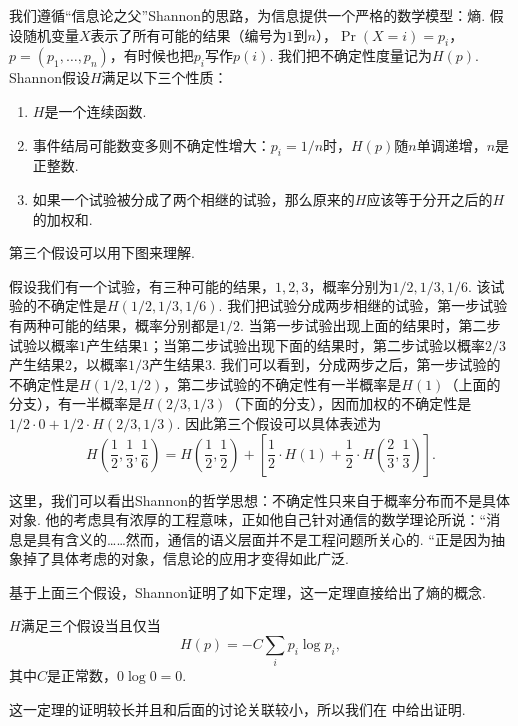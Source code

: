 我们遵循“信息论之父”Shannon的思路，为信息提供一个严格的数学模型：熵. 假设随机变量$X$表示了所有可能的结果（编号为$1$到$n$），$\Pr(X=i)=p_i$，$p=(p_1,\dots,p_n)$，有时候也把$p_i$写作$p(i)$. 我们把不确定性度量记为$H(p)$. Shannon假设$H$满足以下三个性质：
\begin{enumerate}
    \item $H$是一个连续函数.
    \item 事件结局可能数变多则不确定性增大：$p_i=1/n$时，$H(p)$随$n$单调递增，$n$是正整数.
    \item 如果一个试验被分成了两个相继的试验，那么原来的$H$应该等于分开之后的$H$的加权和.
\end{enumerate}

\begin{remark}
    第三个假设可以用下图来理解. 
\begin{center}

\end{center}

    假设我们有一个试验，有三种可能的结果，$1,2,3$，概率分别为$1/2,1/3,1/6$. 该试验的不确定性是$H(1/2,1/3,1/6)$. 我们把试验分成两步相继的试验，第一步试验有两种可能的结果，概率分别都是$1/2$. 当第一步试验出现上面的结果时，第二步试验以概率$1$产生结果$1$；当第二步试验出现下面的结果时，第二步试验以概率$2/3$产生结果$2$，以概率$1/3$产生结果$3$. 我们可以看到，分成两步之后，第一步试验的不确定性是$H(1/2,1/2)$，第二步试验的不确定性有一半概率是$H(1)$（上面的分支），有一半概率是$H(2/3,1/3)$（下面的分支），因而加权的不确定性是$1/2\cdot 0+1/2\cdot H(2/3,1/3)$. 因此第三个假设可以具体表述为
\[
H\left(\frac{1}{2},\frac{1}{3},\frac{1}{6}\right)=H\left(\frac{1}{2},\frac{1}{2}\right)+\left[\frac{1}{2}\cdot H(1)+\frac{1}{2}\cdot H\left(\frac{2}{3},\frac{1}{3}\right)\right].
\]
\end{remark}

这里，我们可以看出Shannon的哲学思想：不确定性只来自于概率分布而不是具体对象. 他的考虑具有浓厚的工程意味，正如他自己针对通信的数学理论所说：“消息是具有含义的……然而，通信的语义层面并不是工程问题所关心的. “正是因为抽象掉了具体考虑的对象，信息论的应用才变得如此广泛. 

基于上面三个假设，Shannon证明了如下定理，这一定理直接给出了熵的概念.

\begin{theorem}[Shannon定理]\label{thm:Shannon-thm}
    $H$满足三个假设当且仅当
    \[H(p)=-C\sum_{i}p_i\log p_i,\]
    其中$C$是正常数，$0\log 0=0$.
\end{theorem}
这一定理的证明较长并且和后面的讨论关联较小，所以我们在 中给出证明.

